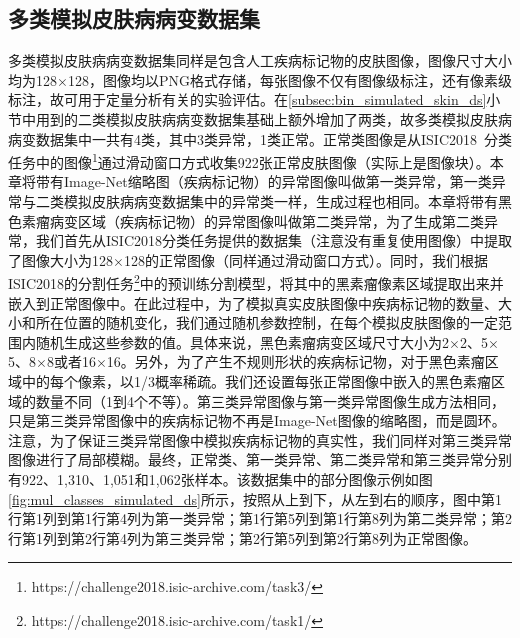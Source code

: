 \subsection{多类模拟皮肤病病变数据集}
多类模拟皮肤病病变数据集同样是包含人工疾病标记物的皮肤图像，图像尺寸大小均为128$\times$128，图像均以PNG格式存储，每张图像不仅有图像级标注，还有像素级标注，故可用于定量分析有关的实验评估。在\ref{subsec:bin_simulated_skin_ds}小节中用到的二类模拟皮肤病病变数据集基础上额外增加了两类，故多类模拟皮肤病病变数据集中一共有4类，其中3类异常，1类正常。正常类图像是从ISIC2018~\cite{codella2019skin, tschandl2018ham10000}分类任务中的图像\footnote{https://challenge2018.isic-archive.com/task3/}通过滑动窗口方式收集922张正常皮肤图像（实际上是图像块）。本章将带有Image-Net缩略图（疾病标记物）的异常图像叫做第一类异常，第一类异常与二类模拟皮肤病病变数据集中的异常类一样，生成过程也相同。本章将带有黑色素瘤病变区域（疾病标记物）的异常图像叫做第二类异常，为了生成第二类异常，我们首先从ISIC2018分类任务提供的数据集（注意没有重复使用图像）中提取了图像大小为128$\times$128的正常图像（同样通过滑动窗口方式）。同时，我们根据ISIC2018的分割任务\footnote{https://challenge2018.isic-archive.com/task1/}中的预训练分割模型，将其中的黑素瘤像素区域提取出来并嵌入到正常图像中。在此过程中，为了模拟真实皮肤图像中疾病标记物的数量、大小和所在位置的随机变化，我们通过随机参数控制，在每个模拟皮肤图像的一定范围内随机生成这些参数的值。具体来说，黑色素瘤病变区域尺寸大小为2$\times$2、5$\times$5、8$\times$8或者16$\times$16。另外，为了产生不规则形状的疾病标记物，对于黑色素瘤区域中的每个像素，以1/3概率稀疏。我们还设置每张正常图像中嵌入的黑色素瘤区域的数量不同（1到4个不等）。第三类异常图像与第一类异常图像生成方法相同，只是第三类异常图像中的疾病标记物不再是Image-Net图像的缩略图，而是圆环。注意，为了保证三类异常图像中模拟疾病标记物的真实性，我们同样对第三类异常图像进行了局部模糊。最终，正常类、第一类异常、第二类异常和第三类异常分别有922、1,310、1,051和1,062张样本。该数据集中的部分图像示例如图\ref{fig:mul_classes_simulated_ds}所示，按照从上到下，从左到右的顺序，图中第1行第1列到第1行第4列为第一类异常；第1行第5列到第1行第8列为第二类异常；第2行第1列到第2行第4列为第三类异常；第2行第5列到第2行第8列为正常图像。
